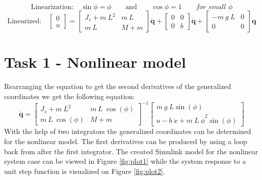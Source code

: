 \documentclass[12pt]{article}
\begin{document}
\medskip
\begin{equation*}
  \text{Linearization:}
  \quad \sin{\phi} = \phi \quad \quad \text{and} \quad \quad \cos{\phi} = 1 \quad \quad \textit{for small } \phi
\end{equation*}
\medskip
\begin{equation}
  \label{eq:lin}
  \text{Linearized:}
  \quad
  \begin{bmatrix}
    0 \\ u
\end{bmatrix}
=
\begin{bmatrix}
    J_s + m ~ L^2 & m ~ L \\
    m ~ L & M + m
\end{bmatrix}
\ddot{\mathbf{q}} + \begin{bmatrix}
 0 & 0 \\
 0 & b
\end{bmatrix} \dot{\mathbf{q}} + \begin{bmatrix}
  -m~g~L & 0 \\
  0 & 0
\end{bmatrix} \mathbf{q}
\end{equation}

\section*{Task 1 - Nonlinear model}
Rearranging the equation \label{eq:nonlin} to get the second derivatives of the generalized coordinates we get the following equation:
\begin{equation}
  \ddot{\mathbf{q}} = 
  \begin{bmatrix}
    J_s + m ~ L^2 & m ~ L ~ \cos\left( \phi \right) \\
    m ~ L ~ \cos\left( \phi \right) & M + m
  \end{bmatrix}^{-1}
  \begin{bmatrix}
    m~ g ~ L \sin\left( \phi \right) \\
    u -b~ \dot{x} + m ~ L \ \dot{\phi} ^2 \sin\left( \phi \right)
  \end{bmatrix}
\end{equation}
With the help of two integrators the generalized coordinates can be determined for the nonlinear model. The first derivatives can be produced by using a loop back from after the first integrator. The created Simulink model for the nonlinear system case can be viewed in Figure \ref{fig:plot1} while the system response to a unit step function is visualized on Figure \ref{fig:plot2}.
\end{document}
